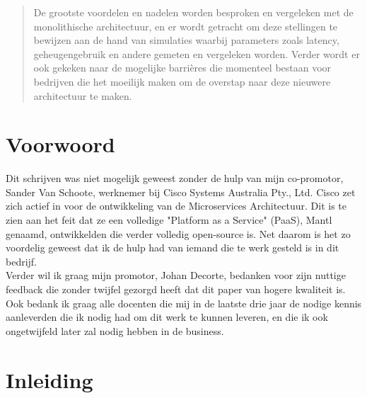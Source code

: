 \documentclass[pdftex,a4paper,12pt,twoside]{report}
\begin{document}
\begin{abstract}
De grootste voordelen en nadelen worden besproken en vergeleken met de monolithische architectuur, en er wordt getracht om deze stellingen te bewijzen aan de hand van simulaties waarbij parameters zoals latency, geheugengebruik en andere gemeten en vergeleken worden. Verder wordt er ook gekeken naar de mogelijke barrières die momenteel bestaan voor bedrijven die het moeilijk maken om de overstap naar deze nieuwere architectuur te maken.
\end{abstract}

\chapter*{Voorwoord}
\label{ch:voorwoord}

Dit schrijven was niet mogelijk geweest zonder de hulp van mijn co-promotor, Sander Van Schoote, werknemer bij Cisco Systems Australia Pty., Ltd. 
Cisco zet zich actief in voor de ontwikkeling van de Microservices Architectuur. Dit is te zien aan het feit dat ze een volledige "Platform as a Service" (PaaS), Mantl genaamd, ontwikkelden die verder volledig open-source is. Net daarom is het zo voordelig geweest dat ik de hulp had van iemand die te werk gesteld is in dit bedrijf.
\\
Verder wil ik graag mijn promotor, Johan Decorte, bedanken voor zijn nuttige feedback die zonder twijfel gezorgd heeft dat dit paper van hogere kwaliteit is.
\\
Ook bedank ik graag alle docenten die mij in de laatste drie jaar de nodige kennis aanleverden die ik nodig had om dit werk te kunnen leveren, en die ik ook ongetwijfeld later zal nodig hebben in de business.

\tableofcontents



\chapter{Inleiding}
\label{ch:inleiding}

\end{document}

